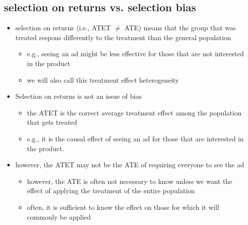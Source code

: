 \documentclass[10pt]{article}
\begin{document}
\subsection{selection on returns vs. selection bias}
\begin{itemize}
    \item selection on returns (i.e., ATET $\neq $ ATE) means that the group that was treated respons differently to the treatment than the general population 
    \begin{itemize}
        \item e.g., seeing an ad might be less effective for those that are not interested in the product 
        \item we will also call this treatment effect heterogeneity
    \end{itemize}
    \item Selection on returns is not an issue of bias 
    \begin{itemize}
        \item the ATET is the correct average treatment effect among the population that gets treated 
        \item e.g., it is the causal effect of seeing an ad for those that are interested in the product. 
    \end{itemize}
    \item however, the ATET may not be the ATE of requiring everyone to see the ad 
    \begin{itemize}
        \item however, the ATE is often not necessary to know unless we want the effect of applying the treatment of the entire population
        \item often, it is sufficient to know the effect on those for which it will commonly be applied 
    \end{itemize}
\end{itemize}
\end{document}

